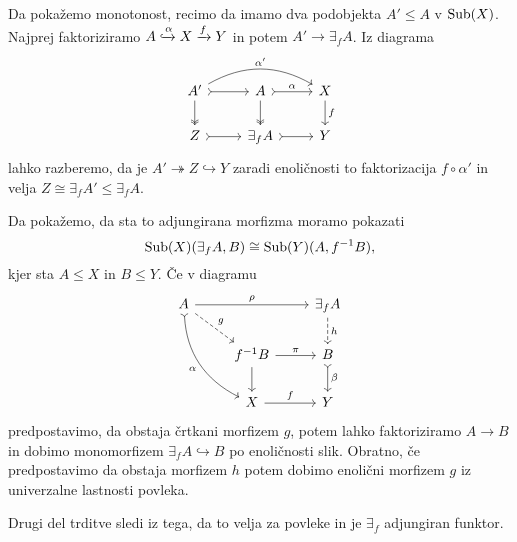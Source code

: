 \documentclass[../kategoricna_logika.tex]{subfiles}
\begin{document}
\begin{dokaz}
  Da pokažemo monotonost, recimo da imamo dva podobjekta $A' \leq A$ v $\operatorname{Sub}(X)$.
  Najprej faktoriziramo $A \xhookrightarrow{\alpha} X \xrightarrow{f} Y$ in potem $A' \to \exists_f A$.
  Iz diagrama
  \begin{equation*}
  \begin{tikzcd}
    A' \ar[d, two heads] \ar[r, tail] \ar[rr, bend left, "\alpha'"] & A \ar[d, two heads] \ar[r, tail, "\alpha"] & X \ar[d, "f"] \\
    Z \ar[r, tail] & \exists_f A \ar[r, tail] & Y
  \end{tikzcd}
  \end{equation*}
  lahko razberemo, da je $A' \twoheadrightarrow Z \hookrightarrow Y$ zaradi enoličnosti to faktorizacija
  $f \circ \alpha'$ in velja $Z \cong \exists_f A' \leq \exists_f A$.

  Da pokažemo, da sta to adjungirana morfizma moramo pokazati 
  $$\operatorname{Sub}(X)(\exists_f A, B) \cong \operatorname{Sub}(Y)(A, f^{-1}B),$$
  kjer sta $A \leq X$ in $B \leq Y$. Če v diagramu
  \begin{equation*}
  \begin{tikzcd}
    A \ar[ddr, bend right, tail, "\alpha"'] \ar[dr, dashed, "g"] \ar[rr, "\rho"] & & \exists_f A \ar[d, dashed, "h"] \\
    & f^{-1}B \ar[d] \ar[r, "\pi"] & B \ar[d, tail, "\beta"] \\
    & X \ar[r, "f"] & Y
  \end{tikzcd}
  \end{equation*}
  predpostavimo, da obstaja črtkani morfizem $g$,
  potem lahko faktoriziramo $A \to B$ in dobimo monomorfizem $\exists_f A \hookrightarrow B$ po enoličnosti slik.
  Obratno, če predpostavimo da obstaja morfizem $h$ potem dobimo enolični morfizem $g$ iz univerzalne lastnosti povleka.

  Drugi del trditve sledi iz tega, da to velja za povleke in je $\exists_f$ adjungiran funktor.
\end{dokaz}
%
\end{document}
